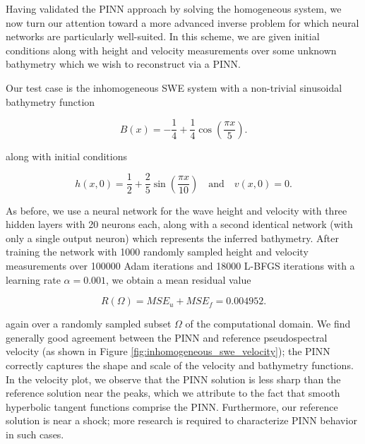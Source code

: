 Having validated the PINN approach by solving the homogeneous system, we now turn our attention toward a more advanced
inverse problem for which neural networks are particularly well-suited. In this scheme, we are given initial conditions 
along with height and velocity measurements over some unknown bathymetry which we wish to reconstruct via a PINN. 

Our test case is the inhomogeneous SWE system with a non-trivial sinusoidal bathymetry function

$$
B(x) = -\frac{1}{4} + \frac{1}{4} \cos{\left( \frac{\pi x}{5} \right)}.
$$

\noindent along with initial conditions

$$
h(x, 0) = \frac{1}{2} + \frac{2}{5} \sin{\left( \frac{\pi x}{10} \right)} \quad \text{and} \quad v(x, 0) = 0.
$$

As before, we use a neural network for the wave height and velocity with three hidden layers with 20 neurons each, along
with a second identical network (with only a single output neuron) which represents the inferred bathymetry. After 
training the network with 1000 randomly sampled height and velocity measurements over 100000 Adam iterations and 18000 
L-BFGS iterations with a learning rate $\alpha = 0.001$, we obtain a mean residual value

$$
R(\Omega) = MSE_u + MSE_f = 0.004952.
$$

\noindent again over a randomly sampled subset $\Omega$ of the computational domain. We find generally good agreement 
between the PINN and reference pseudospectral velocity (as shown in Figure \ref*{fig:inhomogeneous_swe_velocity}); the
PINN correctly captures the shape and scale of the velocity and bathymetry functions. In the velocity plot, we observe
that the PINN solution is less sharp than the reference solution near the peaks, which we attribute to the fact that 
smooth hyperbolic tangent functions comprise the PINN. Furthermore, our reference solution is near a shock; 
more research is required to characterize PINN behavior in such cases.


